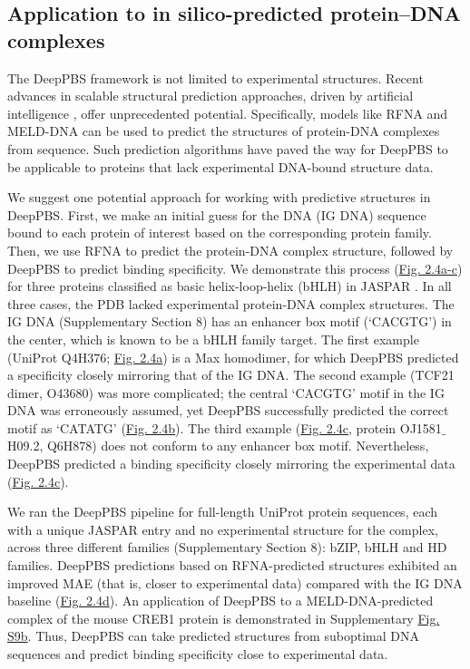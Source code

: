 \subsection{Application to in silico-predicted protein–DNA complexes}
The DeepPBS framework is not limited to experimental structures. Recent advances in scalable structural prediction approaches, driven by artificial intelligence \citep{Jumper2021, Baek2021}, offer unprecedented potential. Specifically, models like RFNA \citep{baek2024na} and MELD-DNA \citep{Esmaeeli2023} can be used to predict the structures of protein-DNA complexes from sequence. Such prediction algorithms have paved the way for DeepPBS to be applicable to proteins that lack experimental DNA-bound structure data.
\par
We suggest one potential approach for working with predictive structures in DeepPBS. First, we make an initial guess for the DNA (IG DNA) sequence bound to each protein of interest based on the corresponding protein family. Then, we use RFNA to predict the protein-DNA complex structure, followed by DeepPBS to predict binding specificity. We demonstrate this process (\hyperref[fig:pdna3]{Fig. 2.4a-c}) for three proteins classified as basic helix-loop-helix (bHLH) in JASPAR \citep{Jaime2022}. In all three cases, the PDB lacked experimental protein-DNA complex structures. The IG DNA (Supplementary Section 8) has an enhancer box motif (‘CACGTG’) in the center, which is known \citep{demartin2021} to be a bHLH family target. The first example (UniProt Q4H376; \hyperref[fig:pdna3]{Fig. 2.4a}) is a Max homodimer, for which DeepPBS predicted a specificity closely mirroring that of the IG DNA. The second example (TCF21 dimer, O43680) was more complicated; the central ‘CACGTG’ motif in the IG DNA was erroneously assumed, yet DeepPBS successfully predicted the correct motif as ‘CATATG’ (\hyperref[fig:pdna3]{Fig. 2.4b}). The third example (\hyperref[fig:pdna3]{Fig. 2.4c}, protein OJ1581$\_$H09.2, Q6H878) does not conform to any enhancer box motif. Nevertheless, DeepPBS predicted a binding specificity closely mirroring the experimental data (\hyperref[fig:pdna3]{Fig. 2.4c}).
\par
We ran the DeepPBS pipeline for full-length UniProt protein sequences, each with a unique JASPAR entry and no experimental structure for the complex, across three different families (Supplementary Section 8): bZIP, bHLH and HD families. DeepPBS predictions based on RFNA-predicted structures exhibited an improved MAE (that is, closer to experimental data) compared with the IG DNA baseline (\hyperref[fig:pdna3]{Fig. 2.4d}). An application of DeepPBS to a MELD-DNA-predicted complex of the mouse CREB1 protein is demonstrated in Supplementary \hyperref[fig:pdnaS9]{Fig. S9b}. Thus, DeepPBS can take predicted structures from suboptimal DNA sequences and predict binding specificity close to experimental data.
